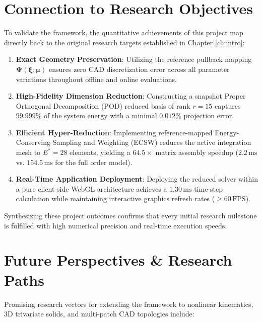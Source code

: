 \section{Connection to Research Objectives}

To validate the framework, the quantitative achievements of this project map directly back to the original research targets established in Chapter \ref{ch:intro}:

\begin{enumerate}[leftmargin=*]
    \item \textbf{Exact Geometry Preservation}: Utilizing the reference pullback mapping $\boldsymbol{\Psi}(\boldsymbol{\xi}; \boldsymbol{\mu})$ ensures zero CAD discretization error across all parameter variations throughout offline and online evaluations.
    \item \textbf{High-Fidelity Dimension Reduction}: Constructing a snapshot Proper Orthogonal Decomposition (POD) reduced basis of rank $r = 15$ captures $99.999\%$ of the system energy with a minimal $0.012\%$ projection error.
    \item \textbf{Efficient Hyper-Reduction}: Implementing reference-mapped Energy-Conserving Sampling and Weighting (ECSW) reduces the active integration mesh to $E^* = 28$ elements, yielding a $64.5\times$ matrix assembly speedup ($2.2\,\text{ms}$ vs. $154.5\,\text{ms}$ for the full order model).
    \item \textbf{Real-Time Application Deployment}: Deploying the reduced solver within a pure client-side WebGL architecture achieves a $1.30\,\text{ms}$ time-step calculation while maintaining interactive graphics refresh rates ($\ge 60\,\text{FPS}$).
\end{enumerate}

Synthesizing these project outcomes confirms that every initial research milestone is fulfilled with high numerical precision and real-time execution speeds.

\section{Future Perspectives \& Research Paths}

Promising research vectors for extending the framework to nonlinear kinematics, 3D trivariate solids, and multi-patch CAD topologies include:

